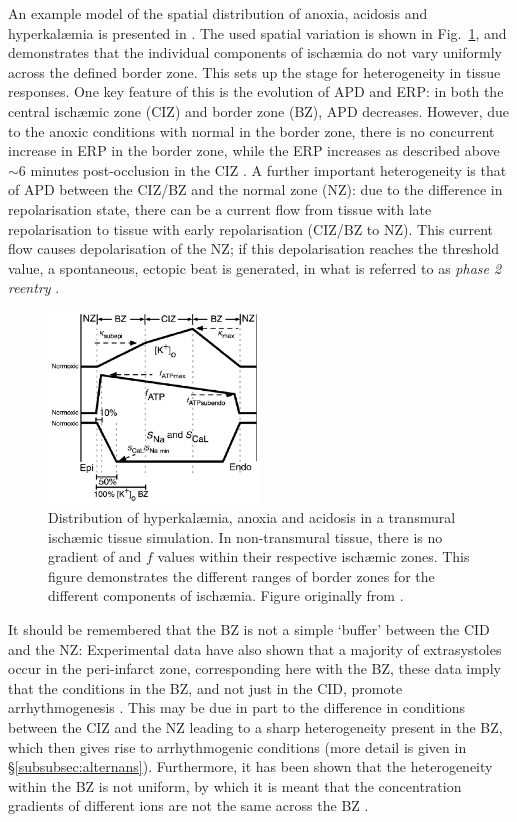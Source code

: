 \documentclass[../thesis-main.tex]{subfiles}
\begin{document}
An example model of the spatial distribution of anoxia, acidosis and hyperkal\ae{}mia is presented in \citet{Tice2007}. The used spatial variation is shown in Fig.~\ref{fig:spatial-ischaemia}, and demonstrates that the individual components of isch\ae{}mia do not vary uniformly across the defined border zone. This sets up the stage for heterogeneity in tissue responses. One key feature of this is the evolution of APD and ERP: in both the central isch\ae{}mic zone (CIZ) and border zone (BZ), APD decreases. However, due to the anoxic conditions with normal \ko{} in the border zone, there is no concurrent increase in ERP in the border zone, while the ERP increases as described above $\sim6$ minutes post-occlusion in the CIZ \citep{Tice2007, Coronel2012}. A further important heterogeneity is that of APD between the CIZ/BZ and the normal zone (NZ): due to the difference in repolarisation state, there can be a current flow from tissue with late repolarisation to tissue with early repolarisation (CIZ/BZ to NZ). This current flow causes depolarisation of the NZ; if this depolarisation reaches the threshold value, a spontaneous, ectopic beat is generated, in what is referred to as \emph{phase 2 reentry} \citep{Coronel2009, Lukas1996, Coronel2012}.
\begin{figure}
 \centering
 \includegraphics[width=0.5\textwidth]{spatial-ischaemia}
 \caption[Distribution of isch\ae{}mic properties in tissue.]{Distribution of hyperkal\ae{}mia, anoxia and acidosis in a transmural isch\ae{}mic tissue simulation. In non-transmural tissue, there is no gradient of \ko{} and $f$ values within their respective isch\ae{}mic zones. This figure demonstrates the different ranges of border zones for the different components of isch\ae{}mia. Figure originally from \citet{Tice2007}.}
 \label{fig:spatial-ischaemia}
\end{figure}

It should be remembered that the BZ is not a simple `buffer' between the CID and the NZ: Experimental data have also shown that a majority of extrasystoles occur in the peri-infarct zone, corresponding here with the BZ, \idest{} these data imply that the conditions in the BZ, and not just in the CID, promote arrhythmogenesis \citep{Chou2007}. This may be due in part to the difference in conditions between the CIZ and the NZ leading to a sharp heterogeneity present in the BZ, which then gives rise to arrhythmogenic conditions (more detail is given in \S\ref{subsubsec:alternans}). Furthermore, it has been shown that the heterogeneity within the BZ is not uniform, by which it is meant that the concentration gradients of different ions are not the same across the BZ \citep{Niederer2013}.
\end{document}
